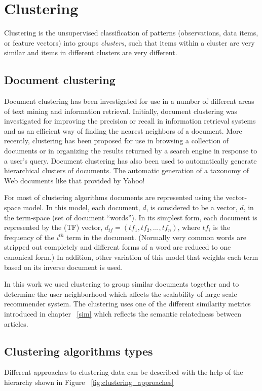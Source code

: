 \section{Clustering}\label{sec:clustering}
Clustering is the unsupervised classification of patterns (observations, data items, or feature vectors) into groups \textit{clusters}, such that items within a cluster are very similar and items in different clusters are very different.

\subsection{Document clustering}
Document clustering has been investigated for use in a number of different areas of text
mining and information retrieval. Initially, document clustering was investigated for improving
the precision or recall in information retrieval systems and as an efficient way of
finding the nearest neighbors of a document. More recently, clustering has been
proposed for use in browsing a collection of documents or in organizing the results
returned by a search engine in response to a user’s query. Document clustering has
also been used to automatically generate hierarchical clusters of documents. The
automatic generation of a taxonomy of Web documents like that provided by Yahoo!

\citep{clustering_15} For most of clustering algorithms documents are represented using the vector-space model. In
this model, each document, $d$, is considered to be a vector, $d$, in the term-space (set of document
“words”). In its simplest form, each document is represented by the (TF) vector,
$d_{tf} = (tf_1, tf_2,..., tf_n)$, where $tf_i$ is the frequency of the $i^{th}$ term in the document. (Normally very common words are
stripped out completely and different forms of a word are reduced to one canonical form.) In
addition, other variation of this model that weights each term based on its inverse document is used.

In this work we used clustering to group similar documents together and to determine the user neighborhood which affects the scalability of large scale recommender system. The clustering uses one of the different similarity metrics introduced in chapter ~\ref{sim} which reflects the semantic relatedness between articles.
\subsection{Clustering algorithms types}
Different approaches to clustering data can be described with the help of the hierarchy shown in Figure ~\ref{fig:clustering_approaches}

